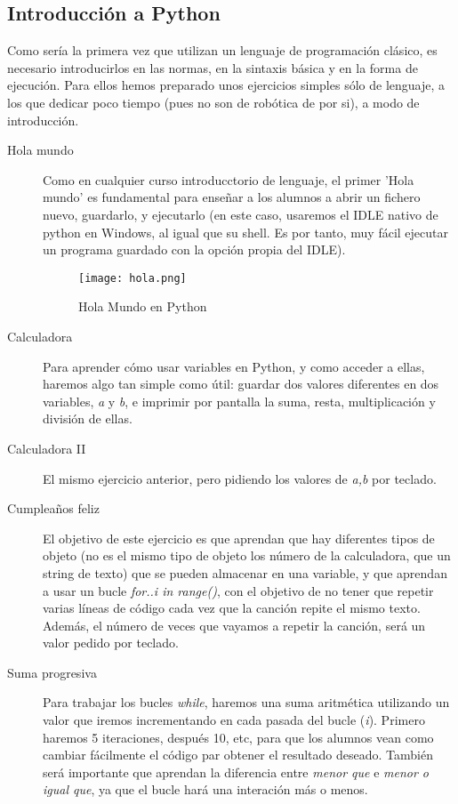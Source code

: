 \subsection{Introducción a Python}
Como sería la primera vez que utilizan un lenguaje de programación clásico, es necesario introducirlos en las normas, en la sintaxis básica y en la forma de ejecución. Para ellos hemos preparado unos ejercicios simples sólo de lenguaje, a los que dedicar poco tiempo (pues no son de robótica de por si), a modo de introducción.
\begin{description}
\item [Hola mundo] Como en cualquier curso introducctorio de lenguaje, el primer 'Hola mundo' es fundamental para enseñar a los alumnos a abrir un fichero nuevo, guardarlo, y ejecutarlo (en este caso, usaremos el IDLE nativo de python en Windows, al igual que su shell. Es por tanto, muy fácil ejecutar un programa guardado con la opción propia del IDLE).
	\begin{figure}[H]
		\texttt{[image: hola.png]}
		\centering
		\label{img:holamundo}
		\caption{Hola Mundo en Python}
	\end{figure}
\item [Calculadora] Para aprender cómo usar variables en Python, y como acceder a ellas, haremos algo tan simple como útil: guardar dos valores diferentes en dos variables, \textit{a} y \textit{b}, e imprimir por pantalla la suma, resta, multiplicación y división de ellas. 
\item[Calculadora II] El mismo ejercicio anterior, pero pidiendo los valores de \textit{a,b} por teclado. 
\item[Cumpleaños feliz] El objetivo de este ejercicio es que aprendan que hay diferentes tipos de objeto (no es el mismo tipo de objeto los número de la calculadora, que un string de texto) que se pueden almacenar en una variable, y que aprendan a usar un bucle \textit{for..i in range()}, con el objetivo de no tener que repetir varias líneas de código cada vez que la canción repite el mismo texto. Además, el número de veces que vayamos a repetir la canción, será un valor pedido por teclado.
\item [Suma progresiva] Para trabajar los bucles \textit{while}, haremos una suma aritmética utilizando un valor que iremos incrementando en cada pasada del bucle (\textit{i}). Primero haremos 5 iteraciones, después 10, etc, para que los alumnos vean como cambiar fácilmente el código par obtener el resultado deseado. También será importante que aprendan la diferencia entre \textit{menor que} e \textit{menor o igual que}, ya que el bucle hará una interación más o menos.

\end{description}
